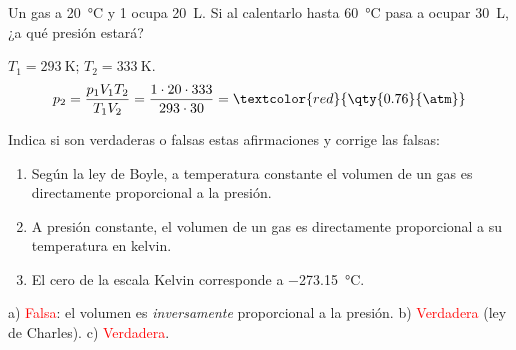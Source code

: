 \begin{exercise}
    Un gas a \qty{20}{\celsius} y \qty{1}{\atm} ocupa \qty{20}{\L}. Si al calentarlo hasta \qty{60}{\celsius} pasa a ocupar \qty{30}{\L}, ¿a qué presión estará?
    \begin{solu}
        \(T_1 = \qty{293}{\kelvin}\); \(T_2 = \qty{333}{\kelvin}\).
        \[ p_2 = \frac{p_1 V_1 T_2}{T_1 V_2} = \frac{1 \cdot 20 \cdot 333}{293 \cdot 30} = \textcolor{red}{\qty{0.76}{\atm}} \]
    \end{solu}
\end{exercise}

\begin{exercise}
    Indica si son verdaderas o falsas estas afirmaciones y corrige las falsas:
    \begin{enumerate}[label=\alph*)]
        \item Según la ley de Boyle, a temperatura constante el volumen de un gas es directamente proporcional a la presión.
        \item A presión constante, el volumen de un gas es directamente proporcional a su temperatura en kelvin.
        \item El cero de la escala Kelvin corresponde a \qty{-273.15}{\celsius}.
    \end{enumerate}
    \begin{solu}
        a) \textcolor{red}{Falsa}: el volumen es \emph{inversamente} proporcional a la presión. b) \textcolor{red}{Verdadera} (ley de Charles). c) \textcolor{red}{Verdadera}.
    \end{solu}
\end{exercise}


